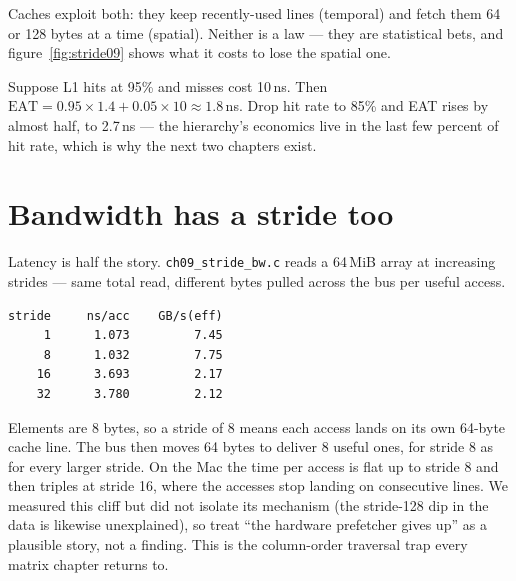 Caches exploit both: they keep recently-used lines (temporal) and
fetch them 64 or 128 bytes at a time (spatial). Neither is a law ---
they are statistical bets, and figure~\ref{fig:stride09} shows what
it costs to lose the spatial one.



\begin{example}
Suppose L1 hits at 95\% and misses cost 10\,ns. Then
$\text{EAT} = 0.95 \times 1.4 + 0.05 \times 10 \approx 1.8$\,ns.
Drop hit rate to 85\% and EAT rises by almost half, to 2.7\,ns --- the
hierarchy's economics live in the last few percent of hit rate,
which is why the next two chapters exist.
\end{example}

\section{Bandwidth has a stride too}
\label{sec:stride09}

Latency is half the story. \texttt{ch09\_stride\_bw.c} reads a
64\,MiB array at increasing strides --- same total read, different
bytes pulled across the bus per useful access.

\begin{example}
\begin{verbatim}
stride     ns/acc    GB/s(eff)
     1      1.073         7.45
     8      1.032         7.75
    16      3.693         2.17
    32      3.780         2.12
\end{verbatim}

Elements are 8 bytes, so a stride of 8 means each access lands on its
own 64-byte cache line. The bus then moves 64 bytes to deliver 8 useful
ones, for stride 8 as for every larger stride. On the Mac the time per
access is flat up to stride 8 and then triples at stride 16, where the
accesses stop landing on consecutive lines. We measured this cliff but
did not isolate its mechanism (the stride-128 dip in the data is
likewise unexplained), so treat ``the hardware prefetcher gives up''
as a plausible story, not a finding. This is the column-order traversal
trap every matrix chapter returns to.
\end{example}

